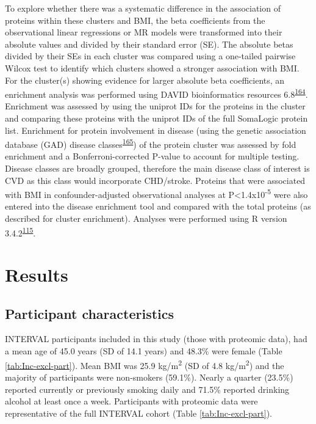 \documentclass[11pt,twoside]{bristolthesis}
\begin{document}
To explore whether there was a systematic difference in the association of proteins within these clusters and BMI, the beta coefficients from the observational linear regressions or MR models were transformed into their absolute values and divided by their standard error (SE). The absolute betas divided by their SEs in each cluster was compared using a one-tailed pairwise Wilcox test to identify which clusters showed a stronger association with BMI. For the cluster(s) showing evidence for larger absolute beta coefficients, an enrichment analysis was performed using DAVID bioinformatics resources 6.8\textsuperscript{\protect\hyperlink{ref-Huang2009}{164}}. Enrichment was assessed by using the uniprot IDs for the proteins in the cluster and comparing these proteins with the uniprot IDs of the full SomaLogic protein list. Enrichment for protein involvement in disease (using the genetic association database (GAD) disease classes\textsuperscript{\protect\hyperlink{ref-Becker2004a}{165}}) of the protein cluster was assessed by fold enrichment and a Bonferroni-corrected P-value to account for multiple testing. Disease classes are broadly grouped, therefore the main disease class of interest is CVD as this class would incorporate CHD/stroke. Proteins that were associated with BMI in confounder-adjusted observational analyses at P\textless1.4x10\textsuperscript{-5} were also entered into the disease enrichment tool and compared with the total proteins (as described for cluster enrichment). Analyses were performed using R version 3.4.2\textsuperscript{\protect\hyperlink{ref-Team2019a}{115}}.

\hypertarget{results-3}{%
\section{Results}\label{results-3}}

\hypertarget{participant-characteristics-1}{%
\subsection{Participant characteristics}\label{participant-characteristics-1}}

INTERVAL participants included in this study (those with proteomic data), had a mean age of 45.0 years (SD of 14.1 years) and 48.3\% were female (Table \ref{tab:Inc-excl-part}). Mean BMI was 25.9 kg/m\textsuperscript{2} (SD of 4.8 kg/m\textsuperscript{2}) and the majority of participants were non-smokers (59.1\%). Nearly a quarter (23.5\%) reported currently or previously smoking daily and 71.5\% reported drinking alcohol at least once a week. Participants with proteomic data were representative of the full INTERVAL cohort (Table \ref{tab:Inc-excl-part}).
\end{document}
